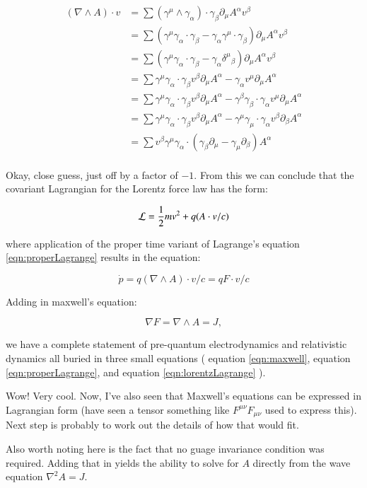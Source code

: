 \documentclass{article}
\newcommand{\grad}[0] {\nabla}
\begin{document}
\begin{align*}
(\grad \wedge A) \cdot v
&= \sum ( \gamma^{\mu} \wedge \gamma_{\alpha} ) \cdot \gamma_{\beta} \partial_{\mu} A^{\alpha} v^{\beta} \\
&= \sum (\gamma^{\mu} \gamma_{\alpha} \cdot \gamma_{\beta} - \gamma_{\alpha} \gamma^{\mu} \cdot \gamma_{\beta}) \partial_{\mu} A^{\alpha} v^{\beta} \\
&= \sum (\gamma^{\mu} \gamma_{\alpha} \cdot \gamma_{\beta} - \gamma_{\alpha} {\delta^{\mu}}_{\beta}) \partial_{\mu} A^{\alpha} v^{\beta} \\
&= \sum 
 \gamma^{\mu} \gamma_{\alpha} \cdot \gamma_{\beta} v^{\beta} \partial_{\mu} A^{\alpha}
-\gamma_{\alpha} v^{\mu} \partial_{\mu} A^{\alpha} \\
&= \sum 
 \gamma^{\mu} \gamma_{\alpha} \cdot \gamma_{\beta} v^{\beta} \partial_{\mu} A^{\alpha}
-
\gamma^{\beta} \gamma_{\beta} \cdot \gamma_{\alpha}
 v^{\mu} \partial_{\mu} A^{\alpha} \\
&= \sum 
 \gamma^{\mu} \gamma_{\alpha} \cdot \gamma_{\beta} v^{\beta} \partial_{\mu} A^{\alpha}
-
\gamma^{\mu} \gamma_{\mu} \cdot \gamma_{\alpha} v^{\beta} \partial_{\beta} A^{\alpha} \\
&= \sum v^{\beta} \gamma^{\mu} \gamma_{\alpha} \cdot ( \gamma_{\beta} \partial_{\mu} - \gamma_{\mu} \partial_{\beta} ) A^{\alpha} \\ 
\end{align*}

Okay, close guess, just off by a factor of $-1$.  From this we can conclude that the covariant Lagrangian for the Lorentz force law has the form:

\begin{equation}\label{eqn:lorentzLagrange}
\mathcal{L} = \frac{1}{2}m v^2 + q (A \cdot v/c)
\end{equation}

where application of the proper time variant of Lagrange's equation \ref{eqn:properLagrange} results in the equation:

\begin{equation}
\dot{p} = q (\grad \wedge A) \cdot v/c = q F \cdot v/c
\end{equation}

Adding in maxwell's equation:

\begin{equation}\label{eqn:maxwell}
\grad F = \grad \wedge A = J,
\end{equation}

we have a complete statement of pre-quantum electrodynamics and relativistic dynamics all buried in three small equations (
equation \ref{eqn:maxwell}, equation \ref{eqn:properLagrange}, and equation \ref{eqn:lorentzLagrange} ).

Wow!  Very cool.  Now, I've also seen that Maxwell's equations can be expressed in Lagrangian form (have seen a tensor something like $F^{\mu\nu} F_{\mu\nu}$ used to express this).  Next step is probably to work out the details of how that would fit.

Also worth noting here is the fact that no guage invariance condition was required.  Adding that in yields the ability to solve for $A$ directly from the wave equation $\grad^2 A = J$.
\end{document}
